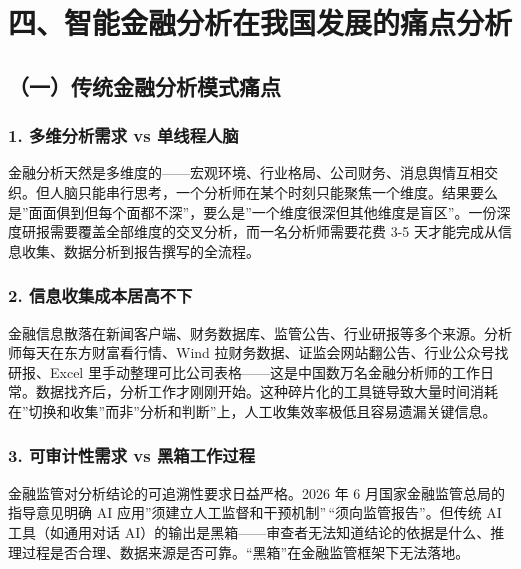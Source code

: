 \documentclass[
]{ctexart}
\begin{document}
\section{四、智能金融分析在我国发展的痛点分析}\label{ux56dbux667aux80fdux91d1ux878dux5206ux6790ux5728ux6211ux56fdux53d1ux5c55ux7684ux75dbux70b9ux5206ux6790}

\subsection{（一）传统金融分析模式痛点}\label{ux4e00ux4f20ux7edfux91d1ux878dux5206ux6790ux6a21ux5f0fux75dbux70b9}

\subsubsection{1. 多维分析需求 vs
单线程人脑}\label{ux591aux7ef4ux5206ux6790ux9700ux6c42-vs-ux5355ux7ebfux7a0bux4ebaux8111}

金融分析天然是多维度的------宏观环境、行业格局、公司财务、消息舆情互相交织。但人脑只能串行思考，一个分析师在某个时刻只能聚焦一个维度。结果要么是''面面俱到但每个面都不深''，要么是''一个维度很深但其他维度是盲区''。一份深度研报需要覆盖全部维度的交叉分析，而一名分析师需要花费
3-5 天才能完成从信息收集、数据分析到报告撰写的全流程。

\subsubsection{2.
信息收集成本居高不下}\label{ux4fe1ux606fux6536ux96c6ux6210ux672cux5c45ux9ad8ux4e0dux4e0b}

金融信息散落在新闻客户端、财务数据库、监管公告、行业研报等多个来源。分析师每天在东方财富看行情、Wind
拉财务数据、证监会网站翻公告、行业公众号找研报、Excel
里手动整理可比公司表格------这是中国数万名金融分析师的工作日常。数据找齐后，分析工作才刚刚开始。这种碎片化的工具链导致大量时间消耗在''切换和收集''而非''分析和判断''上，人工收集效率极低且容易遗漏关键信息。

\subsubsection{3. 可审计性需求 vs
黑箱工作过程}\label{ux53efux5ba1ux8ba1ux6027ux9700ux6c42-vs-ux9ed1ux7bb1ux5de5ux4f5cux8fc7ux7a0b}

金融监管对分析结论的可追溯性要求日益严格。2026 年 6
月国家金融监管总局的指导意见明确 AI
应用''须建立人工监督和干预机制''\,``须向监管报告''。但传统 AI
工具（如通用对话
AI）的输出是黑箱------审查者无法知道结论的依据是什么、推理过程是否合理、数据来源是否可靠。``黑箱''在金融监管框架下无法落地。
\end{document}
